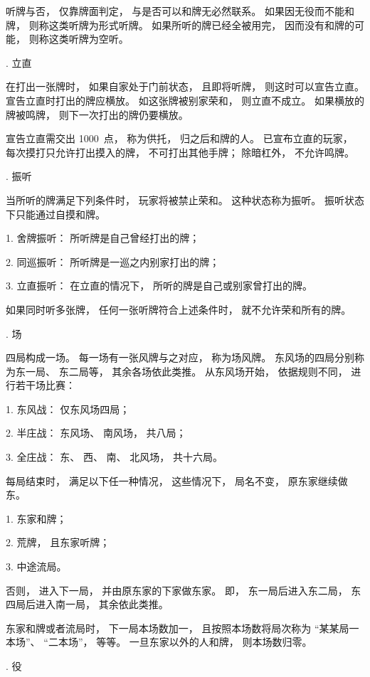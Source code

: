 听牌与否， 仅靠牌面判定， 与是否可以和牌无必然联系。
如果因无役而不能和牌， 则称这类听牌为形式听牌。
如果所听的牌已经全被用完， 因而没有和牌的可能， 则称这类听牌为空听。

. 立直

在打出一张牌时， 如果自家处于门前状态， 且即将听牌，
则这时可以宣告立直。
宣告立直时打出的牌应横放。 如这张牌被别家荣和， 则立直不成立。
如果横放的牌被鸣牌， 则下一次打出的牌仍要横放。

宣告立直需交出 1000~点， 称为供托， 归之后和牌的人。
已宣布立直的玩家， 每次摸打只允许打出摸入的牌， 不可打出其他手牌；
除暗杠外， 不允许鸣牌。

. 振听

当所听的牌满足下列条件时， 玩家将被禁止荣和。
这种状态称为振听。 振听状态下只能通过自摸和牌。

\item{1.} 舍牌振听： 所听牌是自己曾经打出的牌；
\item{2.} 同巡振听： 所听牌是一巡之内别家打出的牌；
\item{3.} 立直振听： 在立直的情况下， 所听的牌是自己或别家曾打出的牌。

如果同时听多张牌， 任何一张听牌符合上述条件时， 就不允许荣和所有的牌。

. 场

四局构成一场。 每一场有一张风牌与之对应， 称为场风牌。
东风场的四局分别称为东一局、 东二局等， 其余各场依此类推。
从东风场开始， 依据规则不同， 进行若干场比赛：

\item{1.} 东风战： 仅东风场四局；
\item{2.} 半庄战： 东风场、 南风场， 共八局；
\item{3.} 全庄战： 东、 西、 南、 北风场， 共十六局。

每局结束时， 满足以下任一种情况， 这些情况下， 局名不变， 原东家继续做东。

\item{1.} 东家和牌；
\item{2.} 荒牌， 且东家听牌；
\item{3.} 中途流局。

否则， 进入下一局， 并由原东家的下家做东家。
即， 东一局后进入东二局， 东四局后进入南一局， 其余依此类推。

东家和牌或者流局时， 下一局本场数加一， 且按照本场数将局次称为
“某某局一本场”、 “二本场”， 等等。
一旦东家以外的人和牌， 则本场数归零。

. 役


